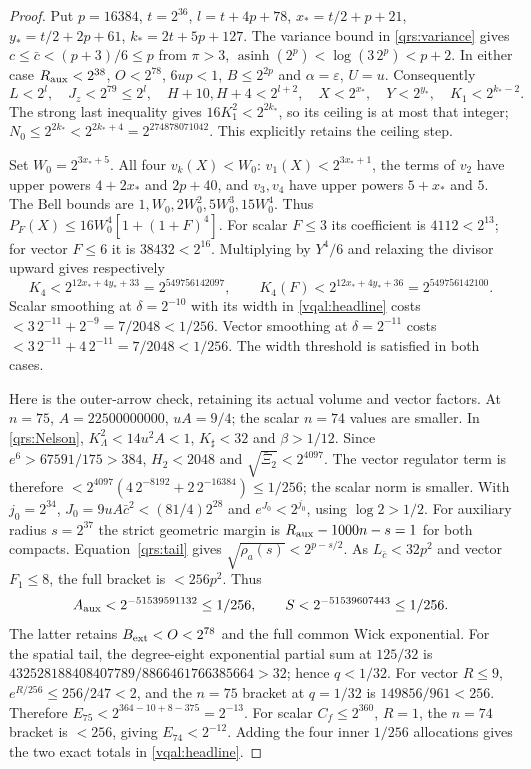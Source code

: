 \documentclass[11pt]{article}
\theoremstyle{plain}
\theoremstyle{definition}
\theoremstyle{remark}
\begin{document}
\begin{proof}
Put $p=16384$, $t=2^{36}$, $l=t+4p+78$,
$x_*=t/2+p+21$, $y_*=t/2+2p+61$, $k_*=2t+5p+127$.
The variance bound in \eqref{qrs:variance} gives
$c\le\bar c<(p+3)/6\le p$ from $\pi>3$,
$\operatorname{asinh}(2^p)<\log(3\,2^p)<p+2$.
In either case $R_{\rm aux}<2^{38}$, $O<2^{78}$,
$6up<1$, $B\le2^{2p}$ and $\alpha=\varepsilon$, $U=u$.
Consequently
\begin{equation}\label{vqal:majorants}
 L<2^l,\quad J_z<2^{79}\le2^l,\quad H+10,H+4<2^{l+2},
 \quad X<2^{x_*},\quad Y<2^{y_*},\quad K_1<2^{k_*-2}.
\end{equation}
The strong last inequality gives
$16K_1^2<2^{2k_*}$, so its ceiling is at most that integer;
$N_0\le2^{2k_*}<2^{2k_*+4}=2^{274878071042}$.
This explicitly retains the ceiling step.

Set $W_0=2^{3x_*+5}$. All four $v_k(X)<W_0$:
$v_1(X)<2^{3x_*+1}$, the terms of $v_2$ have upper powers
$4+2x_*$ and $2p+40$, and $v_3,v_4$ have upper powers
$5+x_*$ and $5$. The Bell bounds are $1,W_0,2W_0^2,5W_0^3,15W_0^4$.
Thus $P_F(X)\le16W_0^4[1+(1+F)^4]$.
For scalar $F\le3$ its coefficient is $4112<2^{13}$; for vector
$F\le6$ it is $38432<2^{16}$. Multiplying by $Y^4/6$ and relaxing
the divisor upward gives respectively
\begin{equation}\label{vqal:k4exponents}
 K_4<2^{12x_*+4y_*+33}=2^{549756142097},\qquad
 K_4(F)<2^{12x_*+4y_*+36}=2^{549756142100}.
\end{equation}
Scalar smoothing at $\delta=2^{-10}$ with its width in
\eqref{vqal:headline} costs $<3\,2^{-11}+2^{-9}=7/2048<1/256$.
Vector smoothing at $\delta=2^{-11}$ costs
$<3\,2^{-11}+4\,2^{-11}=7/2048<1/256$.
The width threshold is satisfied in both cases.

Here is the outer-arrow check, retaining its actual volume and vector
factors. At $n=75$, $A=22500000000$, $uA=9/4$;
the scalar $n=74$ values are smaller. In \eqref{qrs:Nelson},
$K_\Lambda^2<14u^2A<1$, $K_\sharp<32$ and
$\beta>1/12$. Since $e^6>67591/175>384$, $H_2<2048$ and
$\sqrt{\bar\Xi_2}<2^{4097}$. The vector regulator term is therefore
$<2^{4097}(4\,2^{-8192}+2\,2^{-16384})\le1/256$;
the scalar norm is smaller. With $j_0=2^{34}$,
$J_0=9uA\bar c^2<(81/4)2^{28}$ and $e^{J_0}<2^{j_0}$, using
$\log2>1/2$. For auxiliary radius $s=2^{37}$ the strict geometric
margin is $R_{\rm aux}-1000n-s=1$ for both compacts.
Equation~\eqref{qrs:tail} gives
$\sqrt{\rho_a(s)}<2^{p-s/2}$. As $L_{\bar c}<32p^2$ and vector
$F_1\le8$, the full bracket is $<256p^2$. Thus
\begin{equation}\label{vqal:outererrors}
 A_{\rm aux}<2^{-51539591132}\le1/256,\qquad
 S<2^{-51539607443}\le1/256.
\end{equation}
The latter retains $B_{\rm ext}<O<2^{78}$ and the full common Wick
exponential. For the spatial tail, the degree-eight exponential partial
sum at $125/32$ is
$432528188408407789/8866461766385664>32$; hence $q<1/32$.
For vector $R\le9$, $e^{R/256}\le256/247<2$, and the $n=75$
bracket at $q=1/32$ is $149856/961<256$. Therefore
$E_{75}<2^{364-10+8-375}=2^{-13}$.
For scalar $C_f\le2^{360}$, $R=1$, the $n=74$ bracket is $<256$,
giving $E_{74}<2^{-12}$. Adding the four inner $1/256$ allocations
gives the two exact totals in \eqref{vqal:headline}.


\end{proof}
\end{document}
